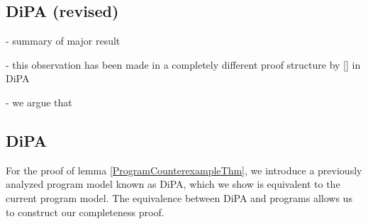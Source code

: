 \subsection{DiPA (revised)}

- summary of major result

- this observation has been made in a completely different proof structure by [] in DiPA

- we argue that 

\subsection{DiPA}

For the proof of lemma \ref{ProgramCounterexampleThm}, we introduce a previously analyzed program model known as DiPA, which we show is equivalent to the current program model. The equivalence between DiPA and programs allows us to construct our completeness proof. 

